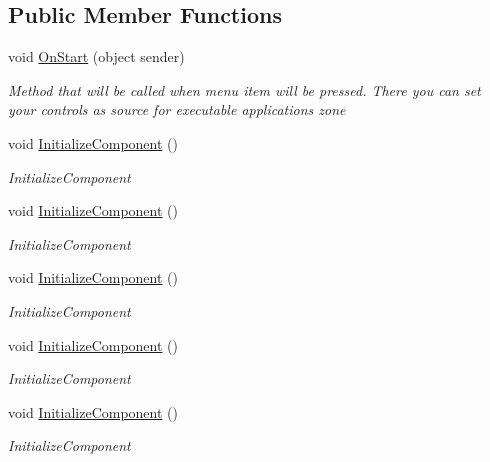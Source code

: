 \subsection*{Public Member Functions}
\begin{DoxyCompactItemize}
\item 
void \mbox{\hyperlink{class_teacher_handbook_1_1_plugins_1_1_feed_1_1_feed_a70afd18136a6dc16b5edec667a02e6c6}{On\+Start}} (object sender)
\begin{DoxyCompactList}\small\item\em Method that will be called when menu item will be pressed. There you can set your controls as source for executable application\textquotesingle{}s zone \end{DoxyCompactList}\item 
void \mbox{\hyperlink{class_teacher_handbook_1_1_plugins_1_1_feed_1_1_feed_af30cfc1a3c7dc2b1874970fbc721113d}{Initialize\+Component}} ()
\begin{DoxyCompactList}\small\item\em Initialize\+Component \end{DoxyCompactList}\item 
void \mbox{\hyperlink{class_teacher_handbook_1_1_plugins_1_1_feed_1_1_feed_af30cfc1a3c7dc2b1874970fbc721113d}{Initialize\+Component}} ()
\begin{DoxyCompactList}\small\item\em Initialize\+Component \end{DoxyCompactList}\item 
void \mbox{\hyperlink{class_teacher_handbook_1_1_plugins_1_1_feed_1_1_feed_af30cfc1a3c7dc2b1874970fbc721113d}{Initialize\+Component}} ()
\begin{DoxyCompactList}\small\item\em Initialize\+Component \end{DoxyCompactList}\item 
void \mbox{\hyperlink{class_teacher_handbook_1_1_plugins_1_1_feed_1_1_feed_af30cfc1a3c7dc2b1874970fbc721113d}{Initialize\+Component}} ()
\begin{DoxyCompactList}\small\item\em Initialize\+Component \end{DoxyCompactList}\item 
void \mbox{\hyperlink{class_teacher_handbook_1_1_plugins_1_1_feed_1_1_feed_af30cfc1a3c7dc2b1874970fbc721113d}{Initialize\+Component}} ()
\begin{DoxyCompactList}\small\item\em Initialize\+Component \end{DoxyCompactList}\item 

\end{DoxyCompactItemize}
